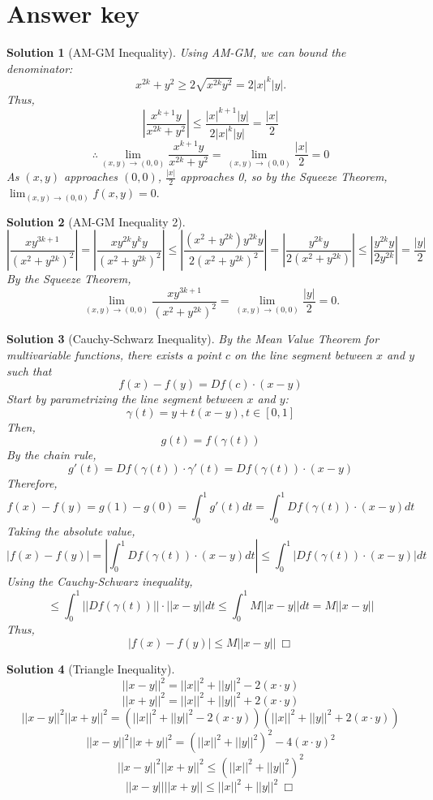 \documentclass{article}
\newtheorem{solution}{Solution}
\begin{document}
\section{Answer key}
\begin{solution}[AM-GM Inequality]
    Using AM-GM, we can bound the denominator:
    \[x^{2k} + y^2 \geq 2\sqrt{x^{2k}y^2} = 2|x|^k|y|.\]
    Thus,
    \[\left| \frac{x^{k+1}y}{x^{2k} + y^2} \right| \leq \frac{|x|^{k+1}|y|}{2|x|^k|y|} = \frac{|x|}{2}\]
    \[\therefore \lim_{(x,y)\to(0,0)}\frac{x^{k+1}y}{x^{2k} + y^2} = \lim_{(x,y)\to(0,0)}\frac{|x|}{2} = 0\]
    As $(x,y)$ approaches $(0,0)$, $\frac{|x|}{2}$ approaches 0, so by the Squeeze Theorem, $\lim_{(x,y) \to (0,0)} f(x,y) = 0.$
\end{solution}
\begin{solution}[AM-GM Inequality 2]
    \[|\frac{xy^{3k+1}}{(x^2 + y^{2k})^2}| = |\frac{xy^{2k}y^{k}y}{(x^2+y^{2k})^2}| \leq |\frac{(x^2+y^{2k})y^{2k}y}{2(x^2+y^{2k})^2}| = |\frac{y^{2k}y}{2(x^2+y^{2k})}| \leq |\frac{y^{2k}y}{2y^{2k}}| = \frac{|y|}{2}\]
    By the Squeeze Theorem, \[\lim_{(x,y)\to(0,0)} \frac{xy^{3k+1}}{(x^2 + y^{2k})^2} = \lim_{(x,y)\to(0,0)} \frac{|y|}{2} = 0.\]
\end{solution}

\begin{solution}[Cauchy-Schwarz Inequality]
    By the Mean Value Theorem for multivariable functions, there exists a point \(c\) on the line segment between \(x\) and \(y\) such that
    \[f(x) - f(y) = Df(c) \cdot (x - y)\]
    Start by parametrizing the line segment between \(x\) and \(y\):
    \[\gamma(t) = y + t(x - y), t \in [0,1]\]
    Then,
    \[g(t) = f(\gamma(t))\]
    By the chain rule,
    \[g'(t) = Df(\gamma(t)) \cdot \gamma'(t) = Df(\gamma(t)) \cdot (x - y)\]
    Therefore,
    \[f(x) - f(y) = g(1) - g(0) = \int_0^1 g'(t) dt = \int_0^1 Df(\gamma(t)) \cdot (x - y) dt\]
    Taking the absolute value,
    \[|f(x) - f(y)| = |\int_0^1 Df(\gamma(t)) \cdot (x - y) dt| \leq \int_0^1 |Df(\gamma(t)) \cdot (x - y)| dt\]
    Using the Cauchy-Schwarz inequality,
    \[\leq \int_0^1 ||Df(\gamma(t))|| \cdot ||x - y|| dt \leq \int_0^1 M ||x - y|| dt = M ||x - y||\]
    Thus,
    \[|f(x) - f(y)| \leq M ||x - y||\: \ensuremath{\Box}\]
\end{solution}

\begin{solution}[Triangle Inequality]
    \[||x - y||^2 = ||x||^2 + ||y||^2 - 2(x \cdot y)\]
    \[||x + y||^2 = ||x||^2 + ||y||^2 + 2(x \cdot y)\]
    \[||x - y||^2 ||x + y||^2 = (||x||^2 + ||y||^2 - 2(x \cdot y))(||x||^2 + ||y||^2 + 2(x \cdot y))\]
    \[||x - y||^2 ||x + y||^2 =  (||x||^2 + ||y||^2)^2 - 4(x \cdot y)^2\]
    \[||x - y||^2 ||x + y||^2 \leq (||x||^2 + ||y||^2)^2\]
    \[||x - y||||x + y|| \leq ||x||^2 + ||y||^2 \: \ensuremath{\Box}\]
\end{solution}
\end{document}
